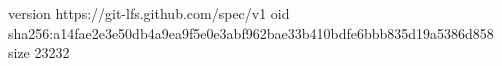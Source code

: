 version https://git-lfs.github.com/spec/v1
oid sha256:a14fae2e3e50db4a9ea9f5e0e3abf962bae33b410bdfe6bbb835d19a5386d858
size 23232

